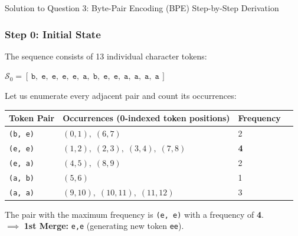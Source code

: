\documentclass[11pt,a4paper]{article}
\begin{document}
\begin{solutionbox}{Solution to Question 3: Byte-Pair Encoding (BPE) Step-by-Step Derivation}
\subsubsection*{Step 0: Initial State}
The sequence consists of 13 individual character tokens:
\begin{center}
    $\mathcal{S}_0 = [\,\texttt{b},\; \texttt{e},\; \texttt{e},\; \texttt{e},\; \texttt{e},\; \texttt{a},\; \texttt{b},\; \texttt{e},\; \texttt{e},\; \texttt{a},\; \texttt{a},\; \texttt{a},\; \texttt{a}\,]$
\end{center}
Let us enumerate every adjacent pair and count its occurrences:
\begin{center}
\small
\begin{tabular}{lll c}
\toprule
\textbf{Token Pair} & \textbf{Occurrences (0-indexed token positions)} & \textbf{Frequency} \\
\midrule
\texttt{(b, e)} & $(0,1),\; (6,7)$ & 2 \\
\texttt{(e, e)} & $(1,2),\; (2,3),\; (3,4),\; (7,8)$ & \textbf{4} \\
\texttt{(e, a)} & $(4,5),\; (8,9)$ & 2 \\
\texttt{(a, b)} & $(5,6)$ & 1 \\
\texttt{(a, a)} & $(9,10),\; (10,11),\; (11,12)$ & 3 \\
\bottomrule
\end{tabular}
\end{center}
The pair with the maximum frequency is \texttt{(e, e)} with a frequency of \textbf{4}.\\
$\implies$ \textbf{1st Merge:} \texttt{e,e} (generating new token \texttt{ee}).


\end{solutionbox}
\end{document}
